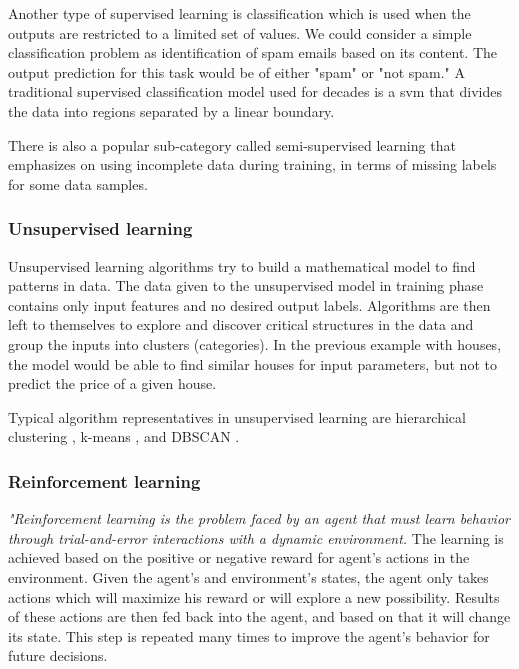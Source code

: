             Another type of supervised learning is classification which is used when the outputs are restricted to a limited set of values. We could consider a simple classification problem as identification of spam emails based on its content. The output prediction for this task would be of either "spam" or "not spam." A traditional supervised classification model used for decades is a \gls{svm} \cite{cortes1995support} that divides the data into regions separated by a linear boundary. 
            
            There is also a popular sub-category called semi-supervised learning \cite{chapelle2009semi} that emphasizes on using incomplete data during training, in terms of missing labels for some data samples.
         
        \subsubsection{Unsupervised learning}
            Unsupervised learning algorithms \cite{kuramasupervisedunsupervised, bishop2006pattern, shalev2014understanding} try to build a mathematical model to find patterns in data. The data given to the unsupervised model in training phase contains only input features and no desired output labels. Algorithms are then left to themselves to explore and discover critical structures in the data and group the inputs into clusters (categories). In the previous example with houses, the model would be able to find similar houses for input parameters, but not to predict the price of a given house.
            
            Typical algorithm representatives in unsupervised learning are hierarchical clustering \cite{johnson1967hierarchical}, k-means \cite{macqueen1967some}, and DBSCAN \cite{ester1996density}.

            
        \subsubsection{Reinforcement learning}
            \textit{"Reinforcement learning is the problem faced by an agent that must learn behavior through trial-and-error interactions with a dynamic environment.} \cite{sutton1998introduction} The learning is achieved based on the positive or negative reward for agent's actions in the environment. Given the agent's and environment's states, the agent only takes actions which will maximize his reward or will explore a new possibility. Results of these actions are then fed back into the agent, and based on that it will change its state. This step is repeated many times to improve the agent's behavior for future decisions. 
            
